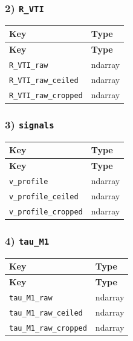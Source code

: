\documentclass[11pt]{article}
\begin{document}
\subsubsection*{2) \texttt{R\_\allowbreak{}VTI}}
\begin{longtable}{|p{}|p{}|}
\hline
\textbf{Key} & \textbf{Type} \\ \hline
\endfirsthead
\hline
\textbf{Key} & \textbf{Type} \\ \hline
\endhead
\texttt{R\_\allowbreak{}VTI\_\allowbreak{}raw} & ndarray \\ \hline
\texttt{R\_\allowbreak{}VTI\_\allowbreak{}raw\_\allowbreak{}ceiled} & ndarray \\ \hline
\texttt{R\_\allowbreak{}VTI\_\allowbreak{}raw\_\allowbreak{}cropped} & ndarray \\ \hline
\end{longtable}

\subsubsection*{3) \texttt{signals}}
\begin{longtable}{|p{}|p{}|}
\hline
\textbf{Key} & \textbf{Type} \\ \hline
\endfirsthead
\hline
\textbf{Key} & \textbf{Type} \\ \hline
\endhead
\texttt{v\_\allowbreak{}profile} & ndarray \\ \hline
\texttt{v\_\allowbreak{}profile\_\allowbreak{}ceiled} & ndarray \\ \hline
\texttt{v\_\allowbreak{}profile\_\allowbreak{}cropped} & ndarray \\ \hline
\end{longtable}

\subsubsection*{4) \texttt{tau\_\allowbreak{}M1}}
\begin{longtable}{|p{}|p{}|}
\hline
\textbf{Key} & \textbf{Type} \\ \hline
\endfirsthead
\hline
\textbf{Key} & \textbf{Type} \\ \hline
\endhead
\texttt{tau\_\allowbreak{}M1\_\allowbreak{}raw} & ndarray \\ \hline
\texttt{tau\_\allowbreak{}M1\_\allowbreak{}raw\_\allowbreak{}ceiled} & ndarray \\ \hline
\texttt{tau\_\allowbreak{}M1\_\allowbreak{}raw\_\allowbreak{}cropped} & ndarray \\ \hline
\end{longtable}
\end{document}
